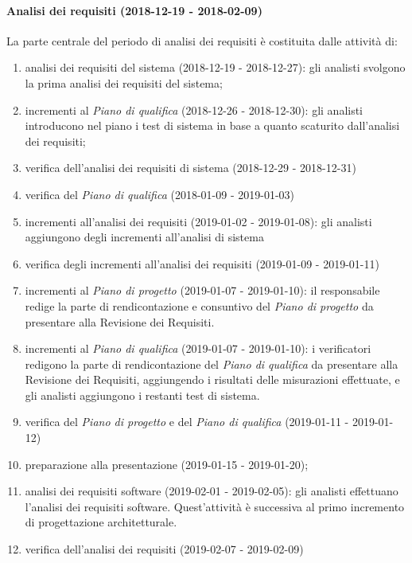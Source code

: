 		\paragraph{Analisi dei requisiti (2018-12-19 - 2018-02-09)\\} La parte centrale del periodo di analisi dei requisiti è costituita dalle attività di:
			\begin{enumerate}[label = 2.2.\arabic*)]
				\item analisi dei requisiti del sistema (2018-12-19 - 2018-12-27): gli analisti svolgono la prima analisi dei requisiti del sistema;
				\item incrementi al \textit{Piano di qualifica} (2018-12-26 - 2018-12-30): gli analisti introducono nel piano i test di sistema in base a quanto scaturito dall'analisi dei requisiti;
				\item verifica dell'analisi dei requisiti di sistema (2018-12-29 - 2018-12-31)
				\item verifica del \textit{Piano di qualifica} (2018-01-09 - 2019-01-03)
				\item incrementi all'analisi dei requisiti (2019-01-02 - 2019-01-08): gli analisti aggiungono degli incrementi all'analisi di sistema
				\item verifica degli incrementi all'analisi dei requisiti (2019-01-09 - 2019-01-11)
				\item incrementi al \textit{Piano di progetto} (2019-01-07 - 2019-01-10): il responsabile redige la parte di rendicontazione e consuntivo del \textit{Piano di progetto} da presentare alla Revisione dei Requisiti.
				\item incrementi al \textit{Piano di qualifica} (2019-01-07 - 2019-01-10): i verificatori redigono la parte di rendicontazione del \textit{Piano di qualifica} da presentare alla Revisione dei Requisiti, aggiungendo i risultati delle misurazioni effettuate, e gli analisti aggiungono i restanti test di sistema.
				\item verifica del \textit{Piano di progetto} e del \textit{Piano di qualifica} (2019-01-11 - 2019-01-12)
				\item preparazione alla presentazione (2019-01-15 - 2019-01-20);
				\item analisi dei requisiti software (2019-02-01 - 2019-02-05): gli analisti effettuano l'analisi dei requisiti software. Quest'attività è successiva al primo incremento di progettazione architetturale.
				\item verifica dell'analisi dei requisiti (2019-02-07 - 2019-02-09)				
			\end{enumerate}

